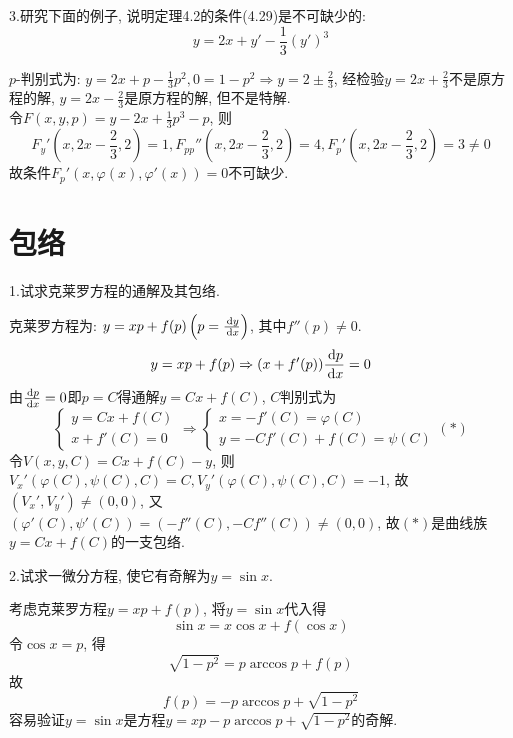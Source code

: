 3.研究下面的例子, 说明定理4.2的条件(4.29)是不可缺少的:
\[y=2x+y'-\frac{1}{3}(y')^3\]
\begin{solve} 
$p$-判别式为: $y=2x+p-\frac{1}{3}p^2,0=1-p^2\Rightarrow y=2\pm\frac{2}{3}$, 经检验$y=2x+\frac{2}{3}$不是原方程的解, $y=2x-\frac{2}{3}$是原方程的解, 但不是特解.\\
令$F(x,y,p)=y-2x+\frac{1}{3}p^3-p$, 则
\[F_y'\left(x,2x-\frac{2}{3},2\right)=1,F_{pp}''\left(x,2x-\frac{2}{3},2\right)=4,F_p'\left(x,2x-\frac{2}{3},2\right)=3\neq0\]
故条件$F_p'(x,\varphi(x),\varphi'(x))=0$不可缺少.
\end{solve}


\section{包络}


1.试求克莱罗方程的通解及其包络.
\begin{solve} 
克莱罗方程为: $y=xp+f(p)\left(p=\frac{\,\mathrm{d} y}{\,\mathrm{d} x}\right)$, 其中$f''(p)\neq0$.\\
\[y=xp+f(p)\Rightarrow(x+f'(p))\frac{\,\mathrm{d} p}{\,\mathrm{d} x}=0\]
由$\frac{\,\mathrm{d} p}{\,\mathrm{d} x}=0$即$p=C$得通解$y=Cx+f(C)$, $C$判别式为
\[\begin{cases}
y=Cx+f(C)\\x+f'(C)=0
\end{cases}\Rightarrow
\begin{cases}
x=-f'(C)=\varphi(C)\\
y=-Cf'(C)+f(C)=\psi(C)
\end{cases}(*)\]
令$V(x,y,C)=Cx+f(C)-y$, 则$V_x'(\varphi(C),\psi(C),C)=C,V_y'(\varphi(C),\psi(C),C)=-1$, 故$(V_x',V_y')\neq(0,0)$, 又$(\varphi'(C),\psi'(C))=(-f''(C),-Cf''(C))\neq(0,0)$, 故$(*)$是曲线族$y=Cx+f(C)$的一支包络.
\end{solve}


2.试求一微分方程, 使它有奇解为$y=\sin x$.
\begin{solve} 
考虑克莱罗方程$y=xp+f(p)$, 将$y=\sin x$代入得
\[\sin x=x\cos x+f(\cos x)\]
令$\cos x=p$, 得
\[\sqrt{1-p^2}=p\arccos p+f(p)\]
故\[f(p)=-p\arccos p+\sqrt{1-p^2}\]
容易验证$y=\sin x$是方程$y=xp-p\arccos p+\sqrt{1-p^2}$的奇解.
\end{solve}